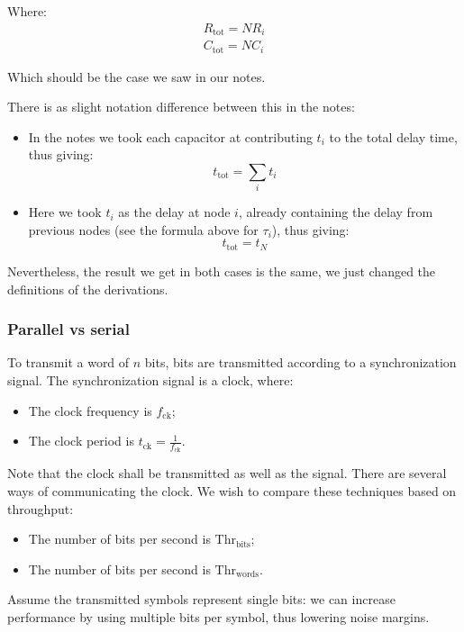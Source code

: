 \documentclass[a4paper,11pt]{article}
\begin{document}
\begin{itemize}
	      Where:
	      $$
		      \begin{aligned}
			      R_\text{tot} = N R_i \\
			      C_\text{tot} = N C_i
		      \end{aligned}
	      $$

	      Which should be the case we saw in our notes.

	      There is as slight notation difference between this in the notes:
	      \begin{itemize}
		      \item In the notes we took each capacitor at contributing $t_i$ to the total delay time, thus giving:
		            $$
			            t_\text{tot} = \sum_i t_i
		            $$
		      \item Here we took $t_i$ as the delay at node $i$, already containing the delay from previous nodes (see the formula above for $\tau_i$), thus giving:
		            $$
			            t_\text{tot} = t_N
		            $$
	      \end{itemize}

	      Nevertheless, the result we get in both cases is the same, we just changed the definitions of the derivations.

\end{itemize}

\subsubsection{Parallel vs serial}

To transmit a word of $n$ bits, bits are transmitted according to a synchronization signal.
The synchronization signal is a clock, where:
\begin{itemize}
	\item The clock frequency is $f_\text{ck}$;
	\item The clock period is $t_\text{ck} = \frac{1}{f_\text{ck}}$.
\end{itemize}
Note that the clock shall be transmitted as well as the signal.
There are several ways of communicating the clock.
We wish to compare these techniques based on throughput:
\begin{itemize}
	\item The number of bits per second is $\text{Thr}_\text{bits}$;
	\item The number of bits per second is $\text{Thr}_\text{words}$.
\end{itemize}

Assume the transmitted symbols represent single bits: we can increase performance by using multiple bits per symbol, thus lowering noise margins.
\end{document}
